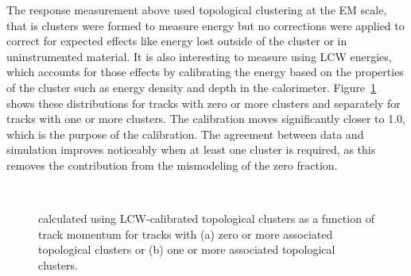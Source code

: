 The response measurement above used topological clustering at the EM scale, that is clusters were formed to measure energy but no corrections were applied to correct for expected effects like energy lost outside of the cluster or in uninstrumented material. 
It is also interesting to measure \epcor using \ac{LCW} energies, which accounts for those effects by calibrating the energy based on the properties of the cluster such as energy density and depth in the calorimeter.
Figure~\ref{fig:eoverp_corrected_lcw} shows these distributions for tracks with zero or more clusters and separately for tracks with one or more clusters.
The calibration moves \epcor significantly closer to 1.0, which is the purpose of the calibration.
The agreement between data and simulation improves noticeably when at least one cluster is required, as this removes the contribution from the mismodeling of the zero fraction. 

\begin{figure}[h]
\centering
{}
~
\caption{\epcor calculated using LCW-calibrated topological clusters as a function of track momentum for tracks with (a) zero or more associated topological clusters or (b) one or more associated topological clusters.}
\label{fig:eoverp_corrected_lcw}
\end{figure}



